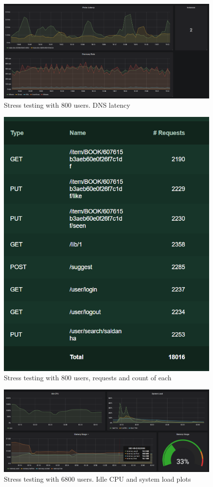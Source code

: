 \documentclass[oneside]{article}
\begin{document}
\begin{figure}[H]
  \centering
  \includegraphics[width=\textwidth]{ tests/img5.png }
  \caption{Stress testing with 800 users. DNS latency}
\end{figure}
\begin{figure}[H]
  \centering
  \includegraphics[width=\textwidth]{ tests/locust.png }
  \caption{Stress testing with 800 users, requests and count of each}
\end{figure}
\begin{figure}[H]
  \centering
  \includegraphics[width=\textwidth]{ tests/6800-1.png }
  \caption{Stress testing with 6800 users. Idle CPU and system load plots}
\end{figure}
\end{document}
